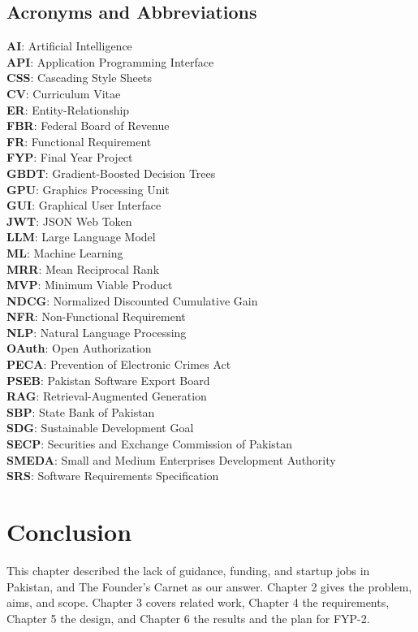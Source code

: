 \documentclass{FastFyp}
\begin{document}
\subsection{Acronyms and Abbreviations}
\textbf{AI}: Artificial Intelligence\\
\textbf{API}: Application Programming Interface\\
\textbf{CSS}: Cascading Style Sheets\\
\textbf{CV}: Curriculum Vitae\\
\textbf{ER}: Entity-Relationship\\
\textbf{FBR}: Federal Board of Revenue\\
\textbf{FR}: Functional Requirement\\
\textbf{FYP}: Final Year Project\\
\textbf{GBDT}: Gradient-Boosted Decision Trees\\
\textbf{GPU}: Graphics Processing Unit\\
\textbf{GUI}: Graphical User Interface\\
\textbf{JWT}: JSON Web Token\\
\textbf{LLM}: Large Language Model\\
\textbf{ML}: Machine Learning\\
\textbf{MRR}: Mean Reciprocal Rank\\
\textbf{MVP}: Minimum Viable Product\\
\textbf{NDCG}: Normalized Discounted Cumulative Gain\\
\textbf{NFR}: Non-Functional Requirement\\
\textbf{NLP}: Natural Language Processing\\
\textbf{OAuth}: Open Authorization\\
\textbf{PECA}: Prevention of Electronic Crimes Act\\
\textbf{PSEB}: Pakistan Software Export Board\\
\textbf{RAG}: Retrieval-Augmented Generation\\
\textbf{SBP}: State Bank of Pakistan\\
\textbf{SDG}: Sustainable Development Goal\\
\textbf{SECP}: Securities and Exchange Commission of Pakistan\\
\textbf{SMEDA}: Small and Medium Enterprises Development Authority\\
\textbf{SRS}: Software Requirements Specification

\section{Conclusion}
This chapter described the lack of guidance, funding, and startup jobs in Pakistan, and The Founder's Carnet as our answer. Chapter 2 gives the problem, aims, and scope. Chapter 3 covers related work, Chapter 4 the requirements, Chapter 5 the design, and Chapter 6 the results and the plan for FYP-2.
\end{document}
